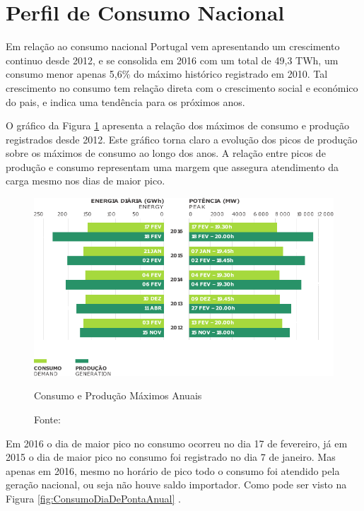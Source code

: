 \section{Perfil de Consumo Nacional}

Em relação ao consumo nacional Portugal vem apresentando um crescimento continuo desde 2012, e se consolida em 2016 com um total de  49,3 TWh, um consumo menor apenas 5,6\% do máximo histórico registrado em 2010. Tal crescimento no consumo tem relação direta com o crescimento social e económico do pais, e indica uma tendência para os próximos anos\cite[p.~6]{REN}. 

O gráfico da Figura \ref{fig:SatisfacaoDoConsumo} apresenta a relação dos máximos de consumo e produção registrados desde 2012. Este gráfico torna claro a evolução dos picos de produção sobre os máximos de consumo ao longo dos anos. A relação entre picos de produção e consumo representam uma margem que assegura atendimento da carga mesmo nos dias de maior pico.

\begin{figure}[H]
	\centering
	\captionsetup{width=0.7\textwidth, font=footnotesize, textfont=bf}	
	\includegraphics[width=0.7\linewidth]{img/ConsumoEProducaoMaximosAnuais.pdf}
	\caption{Consumo e Produção Máximos Anuais}
	\vspace{-3.5mm}
	\caption*{Fonte: }
	\label{fig:SatisfacaoDoConsumo}
\end{figure}

Em 2016 o dia de maior pico no consumo ocorreu no dia 17 de fevereiro, já em 2015 o dia de maior pico no consumo foi registrado no dia 7 de janeiro. Mas apenas em  2016, mesmo no horário de pico todo o consumo foi atendido pela geração nacional, ou seja não houve saldo importador. Como pode ser visto na Figura \ref{fig:ConsumoDiaDePontaAnual} \cite{apren}.

